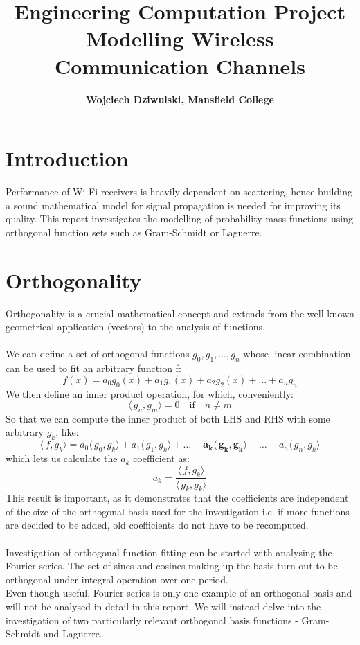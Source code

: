 \documentclass[a4paper]{article}
\title{Engineering Computation Project \\ \large Modelling Wireless Communication Channels}
\author{\textbf{Wojciech Dziwulski, Mansfield College}}
\date{}
\numberwithin{equation}{section}
\begin{document}
\maketitle

\section{Introduction}

Performance of Wi-Fi receivers is heavily dependent on scattering, hence building a sound mathematical model for signal propagation is needed for improving its quality. This report investigates the modelling of probability mass functions using orthogonal function sets such as Gram-Schmidt or Laguerre.

\section{Orthogonality}

Orthogonality is a crucial mathematical concept and extends from the well-known geometrical application (vectors) to the analysis of functions.
\\ \\
We can define a set of orthogonal functions $g_0, g_1, \ldots, g_n$ whose linear combination can be used to fit an arbitrary function f:
\begin{equation}f(x) = a_0 g_0(x)+a_1 g_1(x)+a_2 g_2(x)+\ldots+a_n g_n \end{equation}
\noindent We then define an inner product operation, for which, conveniently:
\begin{equation} \langle\,g_n,g_m\rangle = 0 \quad \textrm{if} \quad n \ne m \end{equation}
So that we can compute the inner product of both LHS and RHS with some arbitrary $g_k$, like:
\begin{equation} \langle\,f,g_k\rangle = a_0\langle\,g_0,g_k\rangle + a_1\langle\,g_1,g_k\rangle + \ldots + \boldsymbol{a_k\langle\,g_k,g_k\rangle} + \ldots + a_n\langle\,g_n,g_k\rangle \end{equation}
which lets us calculate the $a_k$ coefficient as:
\begin{equation} a_k = \frac {\langle\,f,g_k\rangle} {\langle\,g_k,g_k\rangle} \end{equation}
This result is important, as it demonstrates that the coefficients are independent of the size of the orthogonal basis used for the investigation i.e. if more functions are decided to be added, old coefficients do not have to be recomputed.
\\ \\
Investigation of orthogonal function fitting can be started with analysing the Fourier series. The set of sines and cosines making up the basis turn out to be orthogonal under integral operation over one period.
\\
Even though useful, Fourier series is only one example of an orthogonal basis and will not be analysed in detail in this report. We will instead delve into the investigation of two particularly relevant orthogonal basis functions - Gram-Schmidt and Laguerre.
\end{document}
